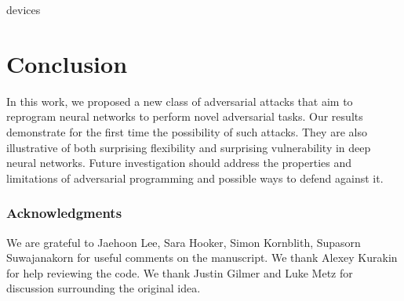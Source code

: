 \documentclass{article}
\begin{document}
devices\section{Conclusion}\label{sec conclusion}

In this work, we proposed a new class of adversarial attacks that aim to reprogram neural networks to perform novel adversarial tasks. 
Our results demonstrate for the first time the possibility of such attacks. 
They are also illustrative of 
both surprising flexibility and surprising vulnerability in deep neural networks. 
Future investigation should address the properties and limitations of adversarial programming and possible ways to defend against it.



\subsubsection*{Acknowledgments}
We are grateful to Jaehoon Lee, Sara Hooker, Simon Kornblith, Supasorn Suwajanakorn for useful comments on the manuscript. We thank Alexey Kurakin for help reviewing the code. We thank Justin Gilmer and Luke Metz for discussion surrounding the original idea.





\end{document}
